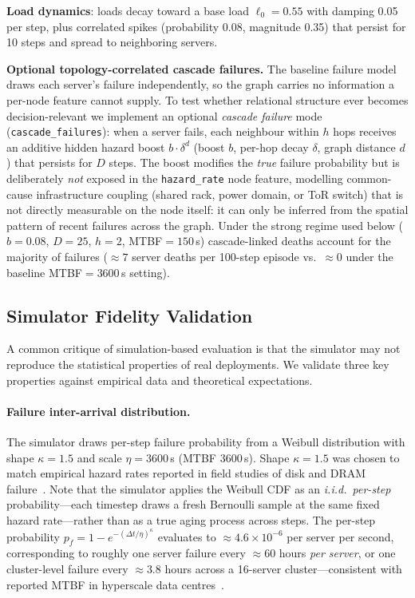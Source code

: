\documentclass[review,1p]{elsarticle}
\theoremstyle{definition}
\begin{document}
\textbf{Load dynamics}: loads decay toward a base load $\ell_0 = 0.55$
with damping 0.05 per step, plus correlated spikes (probability 0.08,
magnitude 0.35) that persist for 10 steps and spread to neighboring
servers.

\textbf{Optional topology-correlated cascade failures.} The baseline
failure model draws each server's failure independently, so the graph
carries no information a per-node feature cannot supply. To test whether
relational structure ever becomes decision-relevant we implement an
optional \emph{cascade failure} mode (\texttt{cascade\_failures}): when a
server fails, each neighbour within $h$ hops receives an additive hidden
hazard boost $b \cdot \delta^{d}$ (boost $b$, per-hop decay $\delta$,
graph distance $d$) that persists for $D$ steps. The boost modifies the
\emph{true} failure probability but is deliberately \emph{not} exposed in
the \texttt{hazard\_rate} node feature, modelling common-cause
infrastructure coupling (shared rack, power domain, or ToR switch) that
is not directly measurable on the node itself: it can only be inferred
from the spatial pattern of recent failures across the graph. Under the
strong regime used below ($b{=}0.08$, $D{=}25$, $h{=}2$, MTBF${=}150$\,s)
cascade-linked deaths account for the majority of failures
(${\approx}7$ server deaths per 100-step episode vs.\ ${\approx}0$ under
the baseline MTBF${=}3600$\,s setting).

\subsection{Simulator Fidelity Validation}
\label{sec:simvalid}

A common critique of simulation-based evaluation is that the simulator
may not reproduce the statistical properties of real deployments.
We validate three key properties against empirical data and
theoretical expectations.

\paragraph{Failure inter-arrival distribution.}
The simulator draws per-step failure probability from a Weibull
distribution with shape $\kappa{=}1.5$ and scale $\eta{=}3600$\,s
(MTBF 3600\,s).  Shape $\kappa{=}1.5$ was chosen to match empirical
hazard rates reported in field studies of disk and DRAM
failure~\cite{barroso2013datacenter}.  Note that the simulator applies
the Weibull CDF as an \emph{i.i.d.\ per-step} probability---each
timestep draws a fresh Bernoulli sample at the same fixed hazard
rate---rather than as a true aging process across steps.
The per-step probability $p_f = 1 - e^{-(\Delta t / \eta)^\kappa}$
evaluates to ${\approx}4.6 \times 10^{-6}$ per server per second,
corresponding to roughly one server failure every ${\approx}60$ hours
\emph{per server}, or one cluster-level failure every ${\approx}3.8$ hours
across a 16-server cluster---consistent with reported MTBF in
hyperscale data centres~\cite{barroso2013datacenter}.
\end{document}
